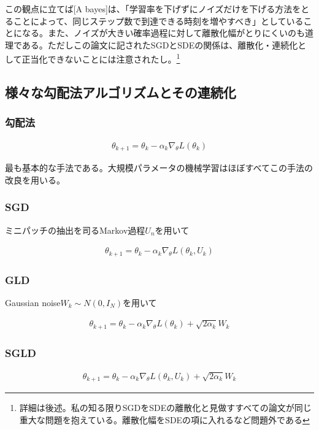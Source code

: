 \documentclass{jsarticle}
\begin{document}
この観点に立てば[A bayes]は、「学習率を下げずにノイズだけを下げる方法をとることによって、同じステップ数で到達できる時刻を増やすべき」としていることになる。また、ノイズが大きい確率過程に対して離散化幅がとりにくいのも道理である。ただしこの論文に記されたSGDとSDEの関係は、離散化・連続化として正当化できないことには注意されたし。\footnote{詳細は後述。私の知る限りSGDをSDEの離散化と見做すすべての論文が同じ重大な問題を抱えている。離散化幅をSDEの項に入れるなど問題外である}





\subsection{様々な勾配法アルゴリズムとその連続化}
\subsubsection{勾配法}
\begin{align}
\theta_{k+1}=\theta_k-\alpha_k\nabla_\theta L(\theta_k)
\end{align}

最も基本的な手法である。大規模パラメータの機械学習はほぼすべてこの手法の改良を用いる。

\subsubsection{SGD}

ミニパッチの抽出を司るMarkov過程$U_n$を用いて

\begin{align}
\theta_{k+1}=\theta_k-\alpha_k\nabla_\theta L(\theta_k,U_k)
\end{align}

\subsubsection{GLD}

Gaussian noise$W_k\sim N(0,I_N)$を用いて

\begin{align}
\theta_{k+1}=\theta_k-\alpha_k\nabla_\theta L(\theta_k)+\sqrt{2\alpha_k}W_k
\end{align}

\subsubsection{SGLD}

\begin{align}
\theta_{k+1}=\theta_k-\alpha_k\nabla_\theta L(\theta_k,U_k)+\sqrt{2\alpha_k}W_k
\end{align}
\end{document}
